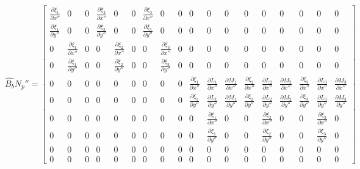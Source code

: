 \begin{equation}\label{key}
\hat{B_b} N_p'' = \begin{bmatrix}
\frac{\partial \xi_1}{\partial x''} & 0 & 0 & \frac{\partial \xi_2}{\partial x''} & 0 & 0 & \frac{\partial \xi_3}{\partial x''} & 0 & 0 & 0 & 0 & 0 & 0 & 0 & 0 & 0 & 0 & 0 \\ 
\frac{\partial \xi_1}{\partial y''} & 0 & 0 & \frac{\partial \xi_2}{\partial y''} & 0 & 0 & \frac{\partial \xi_3}{\partial y''} & 0 & 0 & 0 & 0 & 0 & 0 & 0 & 0 & 0 & 0 & 0  \\ 
0 & \frac{\partial \xi_1}{\partial x''} & 0 & 0 & \frac{\partial \xi_2}{\partial x''} & 0 & 0 & \frac{\partial \xi_3}{\partial x''} & 0 & 0 & 0 & 0 & 0 & 0 & 0 & 0 & 0 & 0\\ 
0 & \frac{\partial \xi_1}{\partial y''} & 0 & 0 & \frac{\partial \xi_2}{\partial y''} & 0 & 0 & \frac{\partial \xi_3}{\partial y''} & 0 & 0 & 0 & 0 & 0 & 0 & 0 & 0 & 0 & 0 \\ 
0 & 0 & 0 & 0 & 0 & 0 & 0 & 0 & 0 & \frac{\partial \xi_1}{\partial x''} & \frac{\partial L_1}{\partial x''} & \frac{\partial M_1}{\partial x''} & \frac{\partial \xi_2}{\partial x''} & \frac{\partial L_2}{\partial x''} & \frac{\partial M_2}{\partial x''} & \frac{\partial \xi_3}{\partial x''} & \frac{\partial L_3}{\partial x''} & \frac{\partial M_3}{\partial x''}  \\ 
0 & 0 & 0 & 0 & 0 & 0 & 0 & 0 & 0 & \frac{\partial \xi_1}{\partial y''} & \frac{\partial L_1}{\partial y''} & \frac{\partial M_1}{\partial y''} & \frac{\partial \xi_2}{\partial y''} & \frac{\partial L_2}{\partial y''} & \frac{\partial M_2}{\partial y''} & \frac{\partial \xi_3}{\partial y''} & \frac{\partial L_3}{\partial y''} & \frac{\partial M_3}{\partial y''} \\
0 & 0 & 0 & 0 & 0 & 0 & 0 & 0 & 0 & 0 & \frac{\partial \xi_1}{\partial x''} & 0 & 0 & \frac{\partial \xi_2}{\partial x''} & 0 & 0 & \frac{\partial \xi_3}{\partial x''} & 0 \\
0 & 0 & 0 & 0 & 0 & 0 & 0 & 0 & 0 & 0 & \frac{\partial \xi_1}{\partial y''} & 0 & 0 & \frac{\partial \xi_2}{\partial y''} & 0 & 0 & \frac{\partial \xi_3}{\partial y''} & 0 \\
0 & 0 & 0 & 0 & 0 & 0 & 0 & 0 & 0 & 0 & 0 & 0 & 0 & 0 & 0 & 0 & 0 & 0\\
0 & 0 & 0 & 0 & 0 & 0 & 0 & 0 & 0 & 0 & 0 & 0 & 0 & 0 & 0 & 0 & 0 & 0
\end{bmatrix} 
\end{equation}

